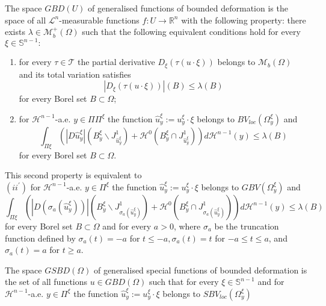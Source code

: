 \begin{definition}
 The space $G B D(U)$ of generalised functions of bounded deformation is the space of all $\mathcal{L}^n$-measurable functions $f: U \rightarrow \mathbb{R}^n$ with the following property: there exists $\lambda \in \mathcal{M}_b^{+}(\Omega)$ such that the following equivalent conditions hold for every $\xi \in \mathbb{S}^{n-1}:$
\begin{enumerate}
     \item for every $\tau \in \mathcal{T}$ the partial derivative $D_{\xi}(\tau(u \cdot \xi))$ belongs to $\mathcal{M}_b(\Omega)$ and its total variation satisfies
$$
\left|D_{\xi}(\tau(u \cdot \xi))\right|(B) \leq \lambda(B)
$$
for every Borel set $B \subset \Omega$;
\item for $\mathcal{H}^{n-1}$-a.e. $y \in \Pi \Pi^{\xi}$ the function $\hat{u}_y^{\xi}:=u_y^{\xi} \cdot \xi$ belongs to $B V_{l o c}\left(\Omega_y^{\xi}\right)$ and
$$
\int_{\Pi \xi}\left(\left|D \hat{u}_y^{\xi}\right|\left(B_y^{\xi} \backslash J_{\hat{u}_y^{\xi}}^1\right)+\mathcal{H}^0\left(B_y^{\xi} \cap J_{\hat{u}_y^{\xi}}^1\right)\right) d \mathcal{H}^{n-1}(y) \leq \lambda(B)
$$
for every Borel set $B \subset \Omega$.
\end{enumerate}
This second property is equivalent to \\


$\left(ii^{\prime}\right)$ for $\mathcal{H}^{n-1}$-a.e. $y \in \Pi^{\xi}$ the function $\hat{u}_y^{\xi}:=u_y^{\xi} \cdot \xi$ belongs to $G B V\left(\Omega_y^{\xi}\right)$ and $$\int_{\Pi \xi}\left(\left|D\left(\sigma_a\left(\hat{u}_y^{\xi}\right)\right)\right|\left(B_y^{\xi} \backslash J_{\sigma_a\left(\hat{u}_y^{\xi}\right)}^1\right)+\mathcal{H}^0\left(B_y^{\xi} \cap J_{\sigma_a\left(\hat{u}_y^{\xi}\right)}^1\right)\right) d \mathcal{H}^{n-1}(y) \leq \lambda(B)$$ for every Borel set $B \subset \Omega$ and for every $a>0$,
where $\sigma_a$ be the truncation function defined by $\sigma_a(t)=-a$ for $t \leq-a, \sigma_a(t)=t$ for $-a \leq t \leq a$, and $\sigma_a(t)=a$ for $t \geq a$. 
\end{definition}


\begin{definition}
 The space $G S B D(\Omega)$ of generalised special functions of bounded deformation is the set of all functions $u \in G B D(\Omega)$ such that for every $\xi \in \mathbb{S}^{n-1}$ and for $\mathcal{H}^{n-1}$-a.e. $y \in \Pi^{\xi}$ the function $\hat{u}_y^{\xi}:=u_y^{\xi} \cdot \xi$ belongs to $S B V_{l o c}\left(\Omega_y^{\xi}\right)$ 
\end{definition}

